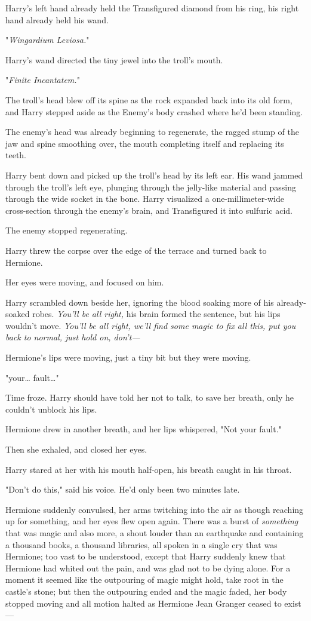 Harry's left hand already held the Transfigured diamond from his ring, his 
right hand already held his wand.

"\emph{Wingardium Leviosa.}"

Harry's wand directed the tiny jewel into the troll's mouth.

"\emph{Finite Incantatem.}"

The troll's head blew off its spine as the rock expanded back into its old 
form, and Harry stepped aside as the Enemy's body crashed where he'd been 
standing.

The enemy's head was already beginning to regenerate, the ragged stump of the 
jaw and spine smoothing over, the mouth completing itself and replacing its 
teeth.

Harry bent down and picked up the troll's head by its left ear. His wand jammed 
through the troll's left eye, plunging through the jelly-like material and 
passing through the wide socket in the bone. Harry visualized a 
one-millimeter-wide cross-section through the enemy's brain, and Transfigured 
it into sulfuric acid.

The enemy stopped regenerating.

Harry threw the corpse over the edge of the terrace and turned back to Hermione.

Her eyes were moving, and focused on him.

Harry scrambled down beside her, ignoring the blood soaking more of his 
already-soaked robes. \emph{You'll be all right,} his brain formed the 
sentence, but his lips wouldn't move. \emph{You'll be all right, we'll find 
some magic to fix all this, put you back to normal, just hold on, don't---}

Hermione's lips were moving, just a tiny bit but they were moving.

"your{\ldots} fault{\ldots}"

Time froze. Harry should have told her not to talk, to save her breath, only he 
couldn't unblock his lips.

Hermione drew in another breath, and her lips whispered, "Not your fault."

Then she exhaled, and closed her eyes.

Harry stared at her with his mouth half-open, his breath caught in his throat.

"Don't do this," said his voice. He'd only been two minutes late.

Hermione suddenly convulsed, her arms twitching into the air as though reaching 
up for something, and her eyes flew open again. There was a burst of 
\emph{something} that was magic and also more, a shout louder than an 
earthquake and containing a thousand books, a thousand libraries, all spoken in 
a single cry that was Hermione; too vast to be understood, except that Harry 
suddenly knew that Hermione had whited out the pain, and was glad not to be 
dying alone. For a moment it seemed like the outpouring of magic might hold, 
take root in the castle's stone; but then the outpouring ended and the magic 
faded, her body stopped moving and all motion halted as Hermione Jean Granger 
ceased to exist---

